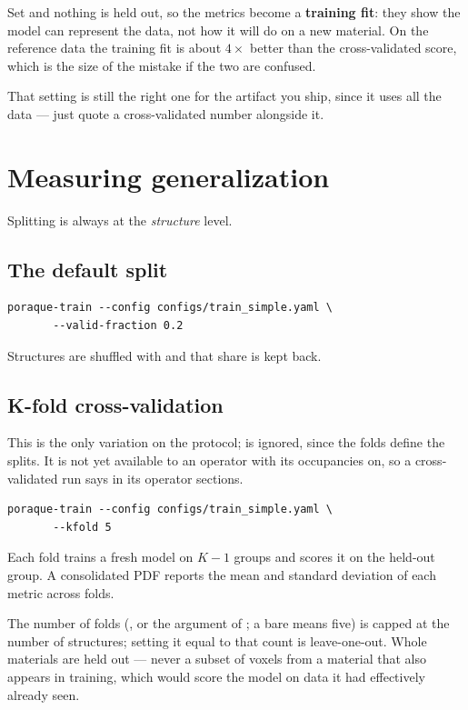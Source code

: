 \begin{pwarn}
Set  and nothing is held out, so the metrics become a
\textbf{training fit}: they show the model can represent the data, not how it
will do on a new material. On the reference data the training fit is about
$4\times$ better than the cross-validated score, which is the size of the
mistake if the two are confused.

That setting is still the right one for the artifact you ship, since it uses
all the data --- just quote a cross-validated number alongside it.
\end{pwarn}

\section{Measuring generalization}

Splitting is always at the \emph{structure} level.

\subsection{The default split}

\begin{lstlisting}
poraque-train --config configs/train_simple.yaml \
       --valid-fraction 0.2
\end{lstlisting}

Structures are shuffled with  and that share is kept back.

\subsection{K-fold cross-validation}
\label{sec:kfold}

This is the only variation on the protocol;  is
ignored, since the folds define the splits. It is not yet available to an
operator with its occupancies on, so a cross-validated run says
 in its operator sections.

\begin{lstlisting}
poraque-train --config configs/train_simple.yaml \
       --kfold 5
\end{lstlisting}

Each fold trains a fresh model on $K-1$ groups and scores it on the held-out
group. A consolidated PDF reports the mean and standard deviation of each
metric across folds.

\begin{ptip}
The number of folds (, or the argument of ; a bare  means five) is capped at the number of structures; setting it equal to that
count is leave-one-out. Whole materials are held out --- never a subset of
voxels from a material that also appears in training, which would score the
model on data it had effectively already seen.
\end{ptip}

